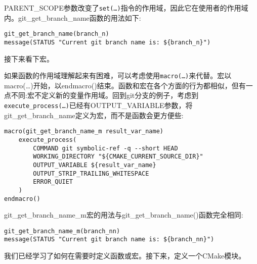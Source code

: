 PARENT\_SCOPE参数改变了\texttt{set(…)}指令的作用域，因此它在使用者的作用域内。git\_get\_branch\_name函数的用法如下:

\begin{lstlisting}[style=styleCMake]
git_get_branch_name(branch_n)
message(STATUS "Current git branch name is: ${branch_n}")
\end{lstlisting}

接下来看下宏。


如果函数的作用域理解起来有困难，可以考虑使用\texttt{macro(…)}来代替。宏以macro(…)开始，以endmacro()结束。函数和宏在各个方面的行为都相似，但有一点不同:宏不定义新的变量作用域。回到git分支的例子，考虑到\texttt{execute\_process(…)}已经有OUTPUT\_VARIABLE参数，将git\_get\_branch\_name定义为宏，而不是函数会更方便些:

\begin{lstlisting}[style=styleCMake]
macro(git_get_branch_name_m result_var_name)
	execute_process(
		COMMAND git symbolic-ref -q --short HEAD
		WORKING_DIRECTORY "${CMAKE_CURRENT_SOURCE_DIR}"
		OUTPUT_VARIABLE ${result_var_name}
		OUTPUT_STRIP_TRAILING_WHITESPACE
		ERROR_QUIET
	)
endmacro()
\end{lstlisting}

git\_get\_branch\_name\_m宏的用法与git\_get\_branch\_name()函数完全相同:

\begin{lstlisting}[style=styleCMake]
git_get_branch_name_m(branch_nn)
message(STATUS "Current git branch name is: ${branch_nn}")
\end{lstlisting}

我们已经学习了如何在需要时定义函数或宏。接下来，定义一个CMake模块。



